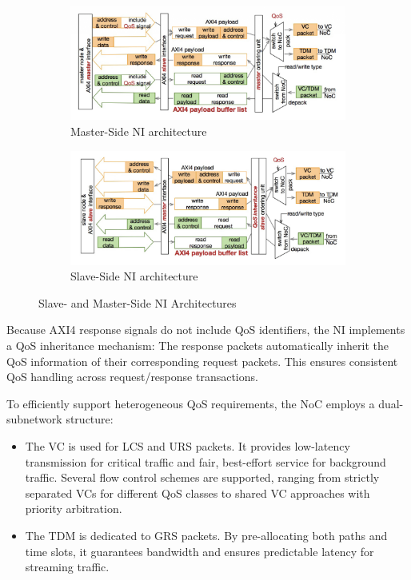 \begin{figure}
    \centering
    \begin{subfigure}[b]{0.48\textwidth}
        \centering
        \includegraphics[width=\textwidth]{img/Master-Side_NI.png}
        \caption{Master-Side NI architecture}
        \label{fig:master_NI}
    \end{subfigure}
    \hfill
    \begin{subfigure}[b]{0.48\textwidth}
        \centering
        \includegraphics[width=\textwidth]{img/Slave-Side_NI.png}
        \caption{Slave-Side NI architecture}
        \label{fig:slave_NI}
    \end{subfigure}
    \caption{Slave- and Master-Side NI Architectures}
    \label{master_slave_ni}
\end{figure}


Because AXI4 response signals do not include QoS identifiers, the NI implements a QoS inheritance mechanism: The response packets automatically inherit the QoS information of their corresponding request packets. This ensures consistent QoS handling across request/response transactions.


To efficiently support heterogeneous QoS requirements, the NoC employs a dual-subnetwork structure:

\begin{itemize}
    \item The \ac{VC} is used for LCS and URS packets. It provides low-latency transmission for critical traffic and fair, best-effort service for background traffic. Several flow control schemes are supported, ranging from strictly separated VCs for different QoS classes to shared VC approaches with priority arbitration.
    \item The \ac{TDM} is dedicated to GRS packets. By pre-allocating both paths and time slots, it guarantees bandwidth and ensures predictable latency for streaming traffic.
\end{itemize}

